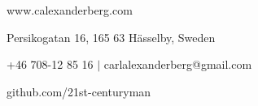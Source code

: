 \documentclass[../main.tex]{subfiles}
\begin{document}
\renewcommand{\maketitle}{
\begin{center}
{\LARGE\theauthor}

www.calexanderberg.com

Persikogatan 16, 165 63 Hässelby, Sweden

+46 708-12 85 16 $|$ carlalexanderberg@gmail.com

github.com/21st-centuryman
\end{center}
}

\maketitle
\end{document}
